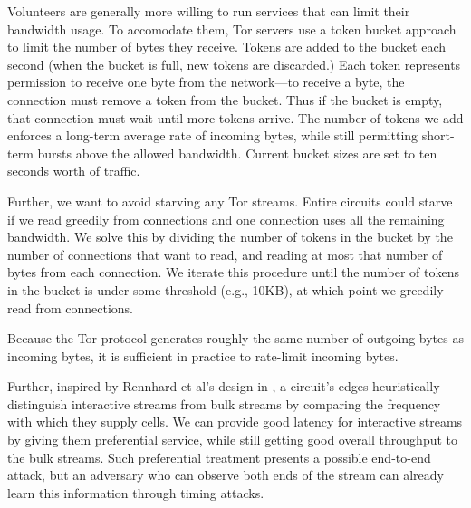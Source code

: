 \documentclass[times,10pt,twocolumn]{article}
\begin{document}

Volunteers are generally more willing to run services that can limit
their bandwidth usage.  To accomodate them, Tor servers use a token
bucket approach to limit the number of bytes they
receive. Tokens are added to the bucket each second (when the bucket is
full, new tokens are discarded.) Each token represents permission to
receive one byte from the network---to receive a byte, the connection
must remove a token from the bucket. Thus if the bucket is empty, that
connection must wait until more tokens arrive. The number of tokens we
add enforces a long-term average rate of incoming bytes, while still
permitting short-term bursts above the allowed bandwidth. Current bucket
sizes are set to ten seconds worth of traffic.

Further, we want to avoid starving any Tor streams. Entire circuits
could starve if we read greedily from connections and one connection
uses all the remaining bandwidth. We solve this by dividing the number
of tokens in the bucket by the number of connections that want to read,
and reading at most that number of bytes from each connection. We iterate
this procedure until the number of tokens in the bucket is under some
threshold (e.g., 10KB), at which point we greedily read from connections.

Because the Tor protocol generates roughly the same number of outgoing
bytes as incoming bytes, it is sufficient in practice to rate-limit
incoming bytes.

Further, inspired by Rennhard et al's design in \cite{anonnet}, a
circuit's edges heuristically distinguish interactive streams from bulk
streams by comparing the frequency with which they supply cells.  We can
provide good latency for interactive streams by giving them preferential
service, while still getting good overall throughput to the bulk
streams. Such preferential treatment presents a possible end-to-end
attack, but an adversary who can observe both
ends of the stream can already learn this information through timing
attacks.

\label{subsec:congestion}
\end{document}
